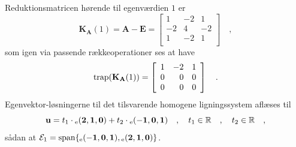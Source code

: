 \begin{example}
Reduktionsmatricen hørende til egenværdien $1$ er
\begin{equation}
\mathbf{K}_{\mathbf{A}}(1) = \mathbf{A} - \mathbf{E} = \left[
                                          \begin{array}{rrr}
                                            1 &  -2 & 1 \\
                                            -2 & 4 & -2 \\
                                            1 & -2& 1 \\
                                          \end{array}
                                        \right] \quad ,
\end{equation}
som igen via passende rækkeoperationer ses at have
\begin{equation}
\mathrm{trap}(\mathbf{K}_{\mathbf{A}}(1)) = \left[
                                          \begin{array}{rrr}
                                            1 &  -2 & 1 \\
                                            0 & 0 & 0 \\
                                            0 & 0& 0 \\
                                          \end{array}
                                        \right] \quad .
\end{equation}
Egenvektor-løsningerne til det tilsvarende homogene ligningssystem aflæses til
\begin{equation}
\mathbf{u} = t_{1} \cdot {_\mathrm{e}\mathbf{(2,1,0)}} + t_{2} \cdot {_\mathrm{e}\mathbf{(-1,0, 1)}} \quad , \quad t_{1} \in \mathbb{R} \quad , \quad t_{2} \in \mathbb{R} \quad ,
\end{equation}
sådan at $\mathcal{E}_{1}= \mathrm{span}\{{_\mathrm{e}\mathbf{(-1,0,1)}}, {_\mathrm{e}\mathbf{(2,1,0)}} \}$. \\


\end{example}
